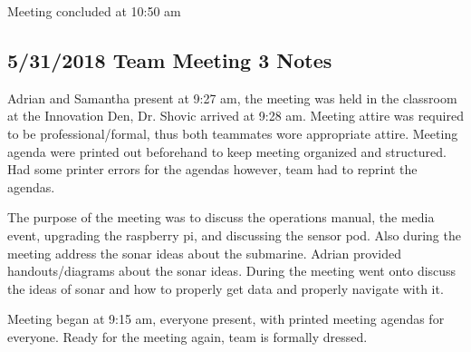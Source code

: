 \documentclass[12pt]{article}
\begin{document}
		\noindent
		Meeting concluded at 10:50 am
	
		\subsection{5/31/2018 Team Meeting 3 Notes}
		
		\noindent
		Adrian and Samantha present at 9:27 am, the meeting was held in the classroom at the Innovation Den, Dr. Shovic arrived at 9:28 am. Meeting attire was required to be professional/formal, thus both teammates wore appropriate attire. Meeting agenda were printed out beforehand to keep meeting organized and structured. Had some printer errors for the agendas however, team had to reprint the agendas. 
		
		\noindent
		The purpose of the meeting was to discuss the operations manual, the media event, upgrading the raspberry pi, and discussing the sensor pod. Also during the meeting address the sonar ideas about the submarine. Adrian provided handouts/diagrams about the sonar ideas. During the meeting went onto discuss the ideas of sonar and how to properly get data and properly navigate with it.
		
		\noindent
		Meeting began at 9:15 am, everyone present, with printed meeting agendas for everyone. Ready for the meeting again, team is formally dressed.
		
\end{document}
